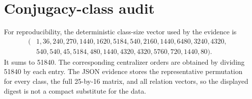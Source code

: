 \documentclass[11pt]{article}
\begin{document}
\section{Conjugacy-class audit}
For reproducibility, the deterministic class-size vector used by the evidence
is
\[
\begin{split}
(&1,36,240,270,1440,1620,5184,540,2160,1440,6480,3240,4320,\\
 &540,540,45,5184,480,1440,4320,4320,5760,720,1440,80).
\end{split}
\]
It sums to 51840.  The corresponding centralizer orders are obtained by
dividing 51840 by each entry.  The JSON evidence stores the representative
permutation for every class, the full 25-by-16 matrix, and all relation
vectors, so the displayed digest is not a compact substitute for the data.



\end{document}

